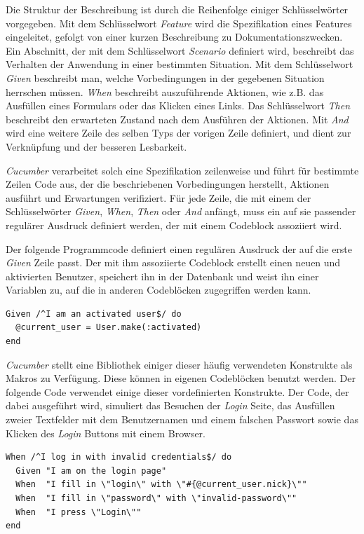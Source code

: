 Die Struktur der Beschreibung ist durch die Reihenfolge einiger
Schlüssel\-wörter vorgegeben. Mit dem Schlüsselwort \textit{Feature}
wird die Spezifikation eines Features eingeleitet, gefolgt von einer
kurzen Beschreibung zu Dokumentationszwecken. Ein Abschnitt, der mit
dem Schlüsselwort \textit{Scenario} definiert wird, beschreibt das
Verhalten der Anwendung in einer bestimmten Situation. Mit dem
Schlüsselwort \textit{Given} beschreibt man, welche Vorbedingungen in
der gegebenen Situation herrschen müssen. \textit{When} beschreibt
auszuführende Aktionen, wie z.B. das Ausfüllen eines Formulars oder
das Klicken eines Links. Das Schlüsselwort \textit{Then} beschreibt
den erwarteten Zustand nach dem Ausführen der Aktionen. Mit
\textit{And} wird eine weitere Zeile des selben Typs der vorigen Zeile
definiert, und dient zur Verknüpfung und der besseren Lesbarkeit.

\textit{Cucumber} verarbeitet solch eine Spezifikation zeilenweise und führt
für bestimmte Zeilen Code aus, der die beschriebenen Vorbedingungen
herstellt, Aktionen ausführt und Erwartungen verifiziert. Für jede
Zeile, die mit einem der Schlüsselwörter \textit{Given},
\textit{When}, \textit{Then} oder \textit{And} anfängt, muss ein auf
sie passender regulärer Ausdruck definiert werden, der mit einem
Codeblock assoziiert wird.

Der folgende Programmcode definiert einen regulären Ausdruck der auf
die erste \textit{Given} Zeile passt. Der mit ihm assoziierte Codeblock
erstellt einen neuen und aktivierten Benutzer, speichert ihn in der
Datenbank und weist ihn einer Variablen zu, auf die in anderen
Codeblöcken zugegriffen werden kann.

\begin{lstlisting}
Given /^I am an activated user$/ do
  @current_user = User.make(:activated)
end
\end{lstlisting}

\textit{Cucumber} stellt eine Bibliothek einiger dieser häufig verwendeten
Konstrukte als Makros zu Verfügung. Diese können in eigenen
Codeblöcken benutzt werden. Der folgende Code verwendet einige dieser
vordefinierten Konstrukte. Der Code, der dabei ausgeführt wird,
simuliert das Besuchen der \textit{Login} Seite, das Ausfüllen zweier
Textfelder mit dem Benutzernamen und einem falschen Passwort sowie das
Klicken des \textit{Login} Buttons mit einem Browser.

\begin{lstlisting}
When /^I log in with invalid credentials$/ do
  Given "I am on the login page"
  When  "I fill in \"login\" with \"#{@current_user.nick}\""
  When  "I fill in \"password\" with \"invalid-password\""
  When  "I press \"Login\""
end
\end{lstlisting}

